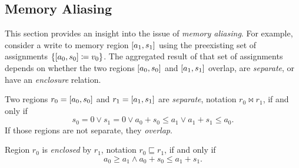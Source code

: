 \subsection{Memory Aliasing}\label{sse:memory_aliasing}
This section provides an insight into the issue of \emph{memory aliasing}.%
For example, consider a write to memory region $[a_1,s_1]$
using the preexisting set of assignments $\{[a_0,s_0]\coloneqq v_0\}$.
The aggregated result of that set of assignments
depends on whether the two regions $[a_0,s_0]$ and $[a_1,s_1]$
overlap, are \emph{separate}, or have an \emph{enclosure} relation.%
%
\begin{definition}
  Two regions $r_0=[a_0,s_0]$ and $r_1=[a_1,s_1]$ are \emph{separate},
  notation $r_0\bowtie r_1$, if and only if
  \begin{equation*}
    s_0=0\vee s_1=0\vee a_0+s_0\leq a_1\vee a_1+s_1\leq a_0.
  \end{equation*}
  If those regions are not separate, they \emph{overlap}.
\end{definition}
\begin{example}
\end{example}
\begin{definition}
  Region $r_0$ is \emph{enclosed} by $r_1$, notation $r_0\sqsubseteq r_1$,
  if and only if
  \begin{equation*}
  a_0\geq a_1\wedge a_0+s_0\leq a_1+s_1.
  \end{equation*}
\end{definition}
\begin{example}
\end{example}

